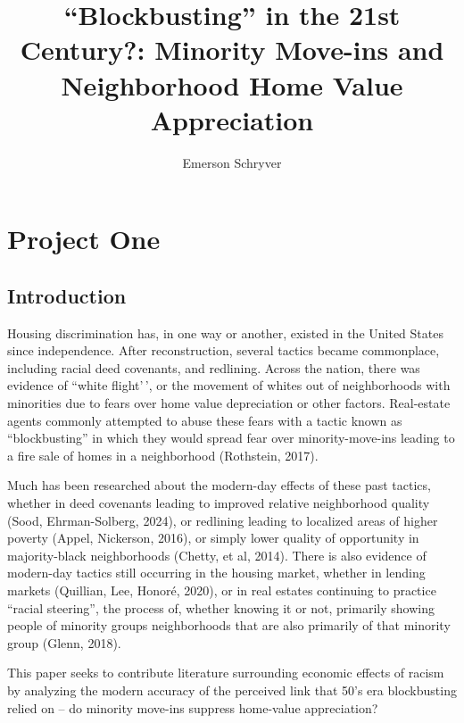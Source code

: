 \documentclass[11pt]{article}
\title{``Blockbusting'' in the 21st Century?: Minority Move-ins and
    Neighborhood Home Value
    Appreciation}
\author{Emerson Schryver}
\begin{document}
    
    \maketitle
    
    

    

    \section{Project One}\label{project-one}

    \subsection{Introduction}\label{introduction}

    Housing discrimination has, in one way or another, existed in the United
States since independence. After reconstruction, several tactics became
commonplace, including racial deed covenants, and redlining. Across the
nation, there was evidence of ``white flight'\,', or the movement of
whites out of neighborhoods with minorities due to fears over home value
depreciation or other factors. Real-estate agents commonly attempted to
abuse these fears with a tactic known as ``blockbusting'' in which they
would spread fear over minority-move-ins leading to a fire sale of homes
in a neighborhood (Rothstein, 2017).

Much has been researched about the modern-day effects of these past
tactics, whether in deed covenants leading to improved relative
neighborhood quality (Sood, Ehrman-Solberg, 2024), or redlining leading
to localized areas of higher poverty (Appel, Nickerson, 2016), or simply
lower quality of opportunity in majority-black neighborhoods (Chetty, et
al, 2014). There is also evidence of modern-day tactics still occurring
in the housing market, whether in lending markets (Quillian, Lee,
Honoré, 2020), or in real estates continuing to practice ``racial
steering'', the process of, whether knowing it or not, primarily showing
people of minority groups neighborhoods that are also primarily of that
minority group (Glenn, 2018).

This paper seeks to contribute literature surrounding economic effects
of racism by analyzing the modern accuracy of the perceived link that
50's era blockbusting relied on -- do minority move-ins suppress
home-value appreciation?
\end{document}
